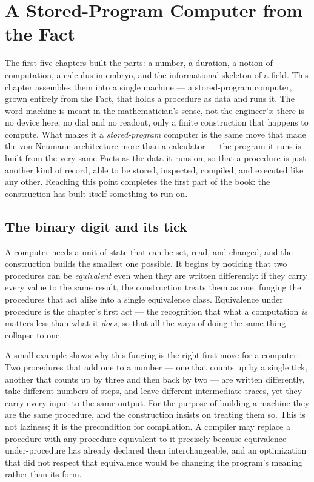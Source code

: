 \chapter{A Stored-Program Computer from the Fact}
\label{chap:stored-program-computer}

The first five chapters built the parts: a number, a duration, a notion of computation, a calculus in
embryo, and the informational skeleton of a field. This chapter assembles them into a single machine
--- a stored-program computer, grown entirely from the Fact, that holds a procedure as data and runs
it. The word machine is meant in the mathematician's sense, not the engineer's: there is no device
here, no dial and no readout, only a finite construction that happens to compute. What makes it a
\emph{stored-program} computer is the same move that made the von Neumann architecture more than a
calculator --- the program it runs is built from the very same Facts as the data it runs on, so that a
procedure is just another kind of record, able to be stored, inspected, compiled, and executed like
any other. Reaching this point completes the first part of the book: the construction has built itself
something to run on.

\section{The binary digit and its tick}
\label{se:the-binary-digit-and-its-tick}

A computer needs a unit of state that can be set, read, and changed, and the construction builds the
smallest one possible. It begins by noticing that two procedures can be \emph{equivalent} even when
they are written differently: if they carry every value to the same result, the construction treats
them as one, funging the procedures that act alike into a single equivalence class. Equivalence under
procedure is the chapter's first act --- the recognition that what a computation \emph{is} matters less
than what it \emph{does}, so that all the ways of doing the same thing collapse to one.

A small example shows why this funging is the right first move for a computer. Two procedures that add
one to a number --- one that counts up by a single tick, another that counts up by three and then back
by two --- are written differently, take different numbers of steps, and leave different intermediate
traces, yet they carry every input to the same output. For the purpose of building a machine they are
the same procedure, and the construction insists on treating them so. This is not laziness; it is the
precondition for compilation. A compiler may replace a procedure with any procedure equivalent to it
precisely because equivalence-under-procedure has already declared them interchangeable, and an
optimization that did not respect that equivalence would be changing the program's meaning rather than
its form.

